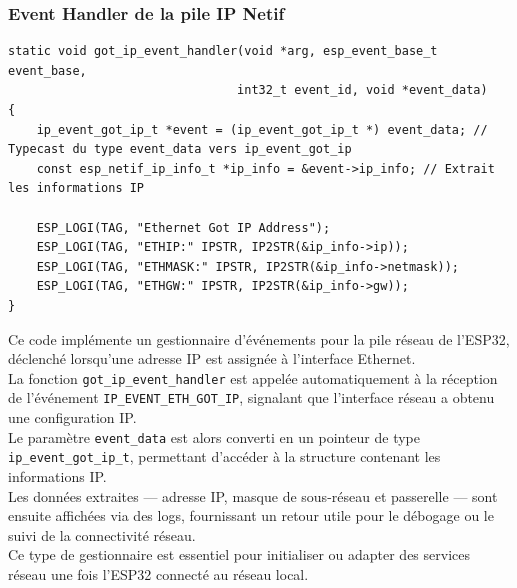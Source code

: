 \documentclass[a4paper,11pt]{article}
\begin{document}
        \newpage
        \subsubsection{Event Handler de la pile IP Netif}
        \begin{lstlisting}[style=C, caption={Event Handler de la pile IP Netif}]
static void got_ip_event_handler(void *arg, esp_event_base_t event_base,
                                int32_t event_id, void *event_data)
{
    ip_event_got_ip_t *event = (ip_event_got_ip_t *) event_data; // Typecast du type event_data vers ip_event_got_ip 
    const esp_netif_ip_info_t *ip_info = &event->ip_info; // Extrait les informations IP

    ESP_LOGI(TAG, "Ethernet Got IP Address");
    ESP_LOGI(TAG, "ETHIP:" IPSTR, IP2STR(&ip_info->ip));
    ESP_LOGI(TAG, "ETHMASK:" IPSTR, IP2STR(&ip_info->netmask));
    ESP_LOGI(TAG, "ETHGW:" IPSTR, IP2STR(&ip_info->gw));
}
      \end{lstlisting}
      \vspace{0.5cm}
      \noindent
Ce code implémente un gestionnaire d’événements pour la pile réseau de l’ESP32, déclenché lorsqu’une adresse IP est assignée à l’interface Ethernet.\\
La fonction \texttt{got\_ip\_event\_handler} est appelée automatiquement à la réception de l’événement \texttt{IP\_EVENT\_ETH\_GOT\_IP}, signalant que l'interface réseau a obtenu une configuration IP.\\
Le paramètre \texttt{event\_data} est alors converti en un pointeur de type \texttt{ip\_event\_got\_ip\_t}, permettant d’accéder à la structure contenant les informations IP.\\
Les données extraites --- adresse IP, masque de sous-réseau et passerelle --- sont ensuite affichées via des logs, fournissant un retour utile pour le débogage ou le suivi de la connectivité réseau.\\
Ce type de gestionnaire est essentiel pour initialiser ou adapter des services réseau une fois l'ESP32 connecté au réseau local.


      \newpage
\end{document}
